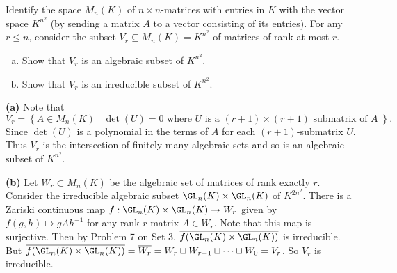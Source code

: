 \documentclass[11pt,letterpaper]{article}
\begin{document}
\begin{problem}
    Identify the space $M_n(K)$ of $n\times n$-matrices with entries in $K$ with the vector space $K^{n^2}$ (by sending a matrix $A$ to a vector consisting of its entries). For any $r\leq n$, consider the subset $V_r\subseteq M_n(K)=K^{n^2}$ of matrices of rank at most $r$.
    \begin{enumerate}[(a)]
        \item Show that $V_r$ is an algebraic subset of $K^{n^2}$.
        \item Show that $V_r$ is an irreducible subset of $K^{n^2}$. 
    \end{enumerate}
\end{problem}

\begin{solution}
    \textbf{(a)} Note that $V_r = \left\{ A\in M_n(K) \mid \det(U)=0 \textrm{ where } U \textrm{ is a } (r+1)\times (r+1) \textrm{ submatrix of }A\;\right\}.$ Since $\det(U)$ is a polynomial in the terms of $A$ for each $(r+1)$-submatrix $U$. Thus $V_r$ is the intersection of finitely many algebraic sets and so is an algebraic subset of $K^{n^2}$. 
    
    \textbf{(b)} Let $W_r\subset M_n(K)$ be the algebraic set of matrices of rank exactly $r$. Consider the irreducible algebraic subset $\GL_n(K)\times \GL_n(K)$ of $K^{2n^2}$. There is a Zariski continuous map $f : \GL_n(K)\times \GL_n(K) \to W_r$ given by $f(g,h)\mapsto gAh^{-1}$ for any rank $r$ matrix $A\in W_r$. Note that this map is surjective. Then by Problem 7 on Set 3, $\overline{f(\GL_n(K)\times\GL_n(K))}$ is irreducible. But $\overline{f(\GL_n(K)\times \GL_n(K))}=\overline{W_r}=W_r\sqcup W_{r-1}\sqcup\cdots\sqcup W_0=V_r$. So $V_r$ is irreducible.   
\end{solution}
\end{document}

